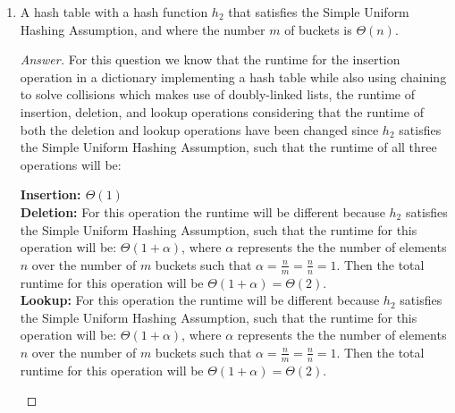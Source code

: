 \documentclass[11pt]{article}
\theoremstyle{definition}
\theoremstyle{definition}
\theoremstyle{definition}
\begin{document}
\begin{enumerate}[label=(\alph*)]
\begin{proof}[Answer]
\begin{itemize}
\begin{center}
$\Theta(n) >\Theta(\log n)$
\end{center}
\item \textbf{Lookup:} The runtime of the lookup operation for a hash table that is using chaining to solve collisions while using a doubly linked list will have a runtime of $\Theta(n)$.$\Theta(n)$ will take more time to run than the lookup operation from a balanced binary tree such that: \\
\begin{center}
$\Theta(n) > \Theta(\log n)$
\end{center}
\end{itemize}
    \end{proof}
    
    
    \vskip 15pt
    \item A hash table with a hash function $h_2$ that satisfies the Simple Uniform Hashing Assumption, and where the number $m$ of buckets is $\Theta(n)$.
\begin{proof}[Answer]
For this question we know that the runtime for the insertion operation in a dictionary implementing a hash table while also using chaining to solve collisions which makes use of doubly-linked lists, the runtime of insertion, deletion, and lookup operations considering that the runtime of both the deletion and lookup operations have been changed since $h_2$ satisfies the Simple Uniform Hashing Assumption, such that the runtime of all three operations will be:   \\
\begin{center}
\textbf{Insertion: $\Theta(1)$} \\
\textbf{Deletion:} For this operation the runtime will be different because $h_2$ satisfies the Simple Uniform Hashing Assumption, such that the runtime for this operation will be: $\Theta(1+\alpha)$, where $\alpha$ represents the the number of elements $n$ over the number of $m$ buckets such that $\alpha = \frac{n}{m} = \frac{n}{n} = 1$. Then the total runtime for this operation will be $\Theta(1+\alpha) = \Theta(2)$.\\
\textbf{Lookup:} For this operation the runtime will be different because $h_2$ satisfies the Simple Uniform Hashing Assumption, such that the runtime for this operation will be: $\Theta(1+\alpha)$, where $\alpha$ represents the the number of elements $n$ over the number of $m$ buckets such that $\alpha = \frac{n}{m} = \frac{n}{n} = 1$.  Then the total runtime for this operation will be $\Theta(1+\alpha) = \Theta(2)$.

\end{center}
\end{proof}
\end{enumerate}
\end{document}
